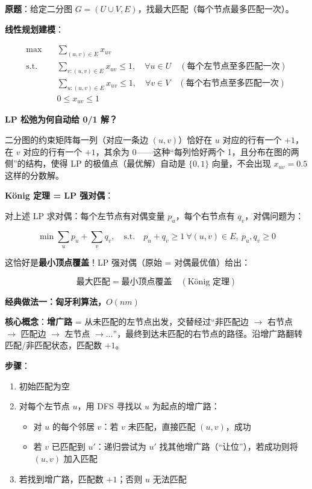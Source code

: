 \documentclass[12pt, a4paper]{ctexart}
\begin{document}
\begin{blackboard}

\textbf{原题}：给定二分图 $G = (U \cup V, E)$，找最大匹配（每个节点最多匹配一次）。

\textbf{线性规划建模}：

\begin{align}
\max \quad & \sum_{(u,v) \in E} x_{uv} \\
\text{s.t.} \quad & \sum_{v: (u,v) \in E} x_{uv} \leq 1, \quad \forall u \in U \quad (\text{每个左节点至多匹配一次})\\
& \sum_{u: (u,v) \in E} x_{uv} \leq 1, \quad \forall v \in V \quad (\text{每个右节点至多匹配一次})\\
& 0 \leq x_{uv} \leq 1
\end{align}

\textbf{LP 松弛为何自动给 0/1 解？}

二分图的约束矩阵每一列（对应一条边 $(u,v)$）恰好在 $u$ 对应的行有一个 $+1$，在 $v$ 对应的行有一个 $+1$，其余为 $0$——这种``每列恰好两个 1，且分布在图的两侧''的结构，使得 LP 的极值点（最优解）自动是 $\{0,1\}$ 向量，不会出现 $x_{uv} = 0.5$ 这样的分数解。

\textbf{König 定理 = LP 强对偶}：

对上述 LP 求对偶：每个左节点有对偶变量 $p_u$，每个右节点有 $q_v$，对偶问题为：

$$\min \sum_u p_u + \sum_v q_v, \quad \text{s.t.} \quad p_u + q_v \geq 1\ \forall (u,v) \in E,\ p_u, q_v \geq 0$$

这恰好是\textbf{最小顶点覆盖}！LP 强对偶（原始 = 对偶最优值）给出：

$$\text{最大匹配} = \text{最小顶点覆盖} \quad (\text{König 定理})$$

\textbf{经典做法一：匈牙利算法，$O(nm)$}

\textbf{核心概念}：\textbf{增广路} = 从未匹配的左节点出发，交替经过``非匹配边 $\to$ 右节点 $\to$ 匹配边 $\to$ 左节点 $\to \ldots$''，最终到达未匹配的右节点的路径。沿增广路翻转匹配/非匹配状态，匹配数 $+1$。

\textbf{步骤}：
\begin{enumerate}
    \item 初始匹配为空
    \item 对每个左节点 $u$，用 DFS 寻找以 $u$ 为起点的增广路：
        \begin{itemize}
            \item 对 $u$ 的每个邻居 $v$：若 $v$ 未匹配，直接匹配 $(u,v)$，成功
            \item 若 $v$ 已匹配到 $u'$：递归尝试为 $u'$ 找其他增广路（``让位''），若成功则将 $(u,v)$ 加入匹配
        \end{itemize}
    \item 若找到增广路，匹配数 $+1$；否则 $u$ 无法匹配
\end{enumerate}


\end{blackboard}
\end{document}
